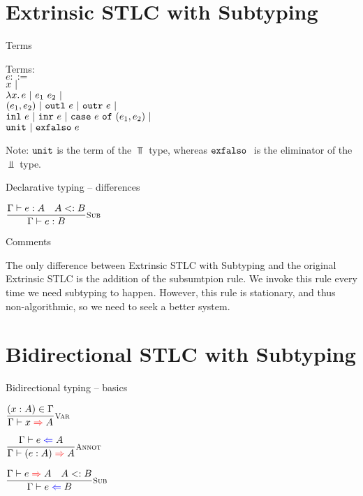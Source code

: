 \documentclass{beamer}
\begin{document}
\section{Extrinsic STLC with Subtyping}

\begin{frame}{Terms}

Terms: \\
$e ::=$ \\
\qquad $x \pipe$ \\
\qquad $\fun{x}{e} \pipe \app{e_1}{e_2} \pipe$ \\
\qquad $\pair{e_1}{e_2} \pipe \outl{e} \pipe \outr{e} \pipe$ \\
\qquad $\inl{e} \pipe \inr{e} \pipe \case{e}{e_1}{e_2} \pipe$ \\
\qquad $\unit \pipe \exfalso{e}$

\vspace{2em}

Note: $\unit$ is the term of the $\Top$ type, whereas $\exfalso$ is the eliminator of the $\Bot$ type.

\end{frame}

\begin{frame}{Declarative typing -- differences}

\begin{center}
  $\infrule[Sub]{\typing{e}{A} \quad \sidecond{\subtyping{A}{B}}}{\typing{e}{B}}$
\end{center}

\end{frame}

\begin{frame}{Comments}

The only difference between Extrinsic STLC with Subtyping and the original Extrinsic STLC is the addition of the subsumtpion rule. We invoke this rule every time we need subtyping to happen. However, this rule is stationary, and thus non-algorithmic, so we need to seek a better system.

\end{frame}

\section{Bidirectional STLC with Subtyping}

\begin{frame}{Bidirectional typing -- basics}

\begin{center}
  $\infrule[Var]{\sidecond{(x : A) \in \Gamma}}{\infer{x}{A}}$

  \vspace{2em}

  $\infrule[Annot]{\check{e}{A}}{\infer{\annot{e}{A}}{A}}$

  \vspace{2em}

  $\infrule[Sub]{\infer{e}{A} \quad \sidecond{\subtyping{A}{B}}}{\check{e}{B}}$
\end{center}

\end{frame}
\end{document}
